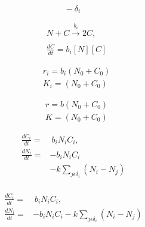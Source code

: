 \documentclass{article}
\begin{document}
\begin{equation}
    -~\delta_{i}
\end{equation}

\begin{subequations}
	\label{eq:9}
	\begin{align}
	&N + C \xrightarrow[]{b_{i}} 2C,\\
	&\frac{dC}{dt} = b_{i}[N][C]
	\end{align}
\end{subequations}

\begin{subequations}
	\label{eq:9}
	\begin{align}
	&r_{i} = b_{i}(N_0 + C_0)\\
	&K_{i} = (N_0 + C_0)
	\end{align}
\end{subequations}

\begin{subequations}
	\label{eq:9}
	\begin{align}
	&r = b(N_0 + C_0)\\
	&K = (N_0 + C_0)
	\end{align}
\end{subequations}


\begin{subequations}
	\label{eq:5}
	\begin{align}
	\frac{dC_{i}}{dt} =&~b_{i}N_{i}C_{i},\\
	\frac{dN_{i}}{dt} =& - b_{i}N_{i}C_{i}\\
	 & - k\sum_{j \epsilon \delta_i}(N_{i} - N_{j})\\
	\end{align}
\end{subequations}

\begin{subequations}
	\label{eq:5}
	\begin{align}
	\frac{dC_{i}}{dt} =&~b_{i}N_{i}C_{i},\\
	\frac{dN_{i}}{dt} =& - b_{i}N_{i}C_{i} - k\sum_{j \epsilon \delta_i}(N_{i} - N_{j})\\
	\end{align}
\end{subequations}
\end{document}
